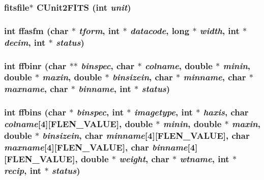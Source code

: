 \subsubsection{\setlength{\rightskip}{0pt plus 5cm}\bf{fitsfile}$\ast$ CUnit2FITS (int {\em unit})}\label{test_2roimasker_2fitsio_8h_e08abd96bc54834ccfe5441c26d459de}


\subsubsection{\setlength{\rightskip}{0pt plus 5cm}int ffasfm (char $\ast$ {\em tform}, int $\ast$ {\em datacode}, long $\ast$ {\em width}, int $\ast$ {\em decim}, int $\ast$ {\em status})}\label{test_2roimasker_2fitsio_8h_e10ab520ca972149eb9fafabd21a1606}


\subsubsection{\setlength{\rightskip}{0pt plus 5cm}int ffbinr (char $\ast$$\ast$ {\em binspec}, char $\ast$ {\em colname}, double $\ast$ {\em minin}, double $\ast$ {\em maxin}, double $\ast$ {\em binsizein}, char $\ast$ {\em minname}, char $\ast$ {\em maxname}, char $\ast$ {\em binname}, int $\ast$ {\em status})}\label{test_2roimasker_2fitsio_8h_f9daf75aaa15d49359ba6fe025e80b86}


\subsubsection{\setlength{\rightskip}{0pt plus 5cm}int ffbins (char $\ast$ {\em binspec}, int $\ast$ {\em imagetype}, int $\ast$ {\em haxis}, char {\em colname}[4][FLEN\_\-VALUE], double $\ast$ {\em minin}, double $\ast$ {\em maxin}, double $\ast$ {\em binsizein}, char {\em minname}[4][FLEN\_\-VALUE], char {\em maxname}[4][FLEN\_\-VALUE], char {\em binname}[4][FLEN\_\-VALUE], double $\ast$ {\em weight}, char $\ast$ {\em wtname}, int $\ast$ {\em recip}, int $\ast$ {\em status})}\label{test_2roimasker_2fitsio_8h_25532ba78224456d371c8724bdbc485f}


